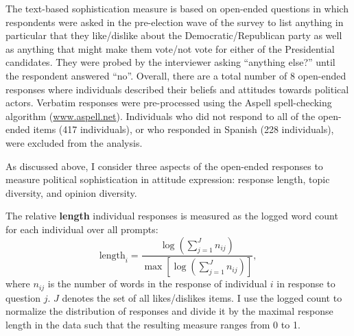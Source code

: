 \documentclass[12pt]{article}
\begin{document}
The text-based sophistication measure is based on open-ended questions in which respondents were asked in the pre-election wave of the survey to list anything in particular that they like/dislike about the Democratic/Republican party as well as anything that might make them vote/not vote for either of the Presidential candidates. They were probed by the interviewer asking ``anything else?'' until the respondent answered ``no''. Overall, there are a total number of 8 open-ended responses where individuals described their beliefs and attitudes towards political actors. Verbatim responses were pre-processed using the Aspell spell-checking algorithm (\url{www.aspell.net}). Individuals who did not respond to all of the open-ended items (417 individuals), or who responded in Spanish (228 individuals), were excluded from the analysis. 

As discussed above, I consider three aspects of the open-ended responses to measure political sophistication in attitude expression: response length, topic diversity, and opinion diversity. 

The relative \textbf{length} individual responses is measured as the logged word count for each individual over all prompts:
\begin{equation}
\text{length}_i = \dfrac{\log\left(\sum_{j=1}^J n_{ij}\right)}{\max\left[\log\left(\sum_{j=1}^J n_{ij}\right)\right]},
\end{equation}
where $n_{ij}$ is the number of words in the response of individual $i$ in response to question $j$. $J$ denotes the set of all likes/dislikes items. I use the logged count to normalize the distribution of responses and divide it by the maximal response length in the data such that the resulting measure ranges from 0 to 1.
\end{document}
